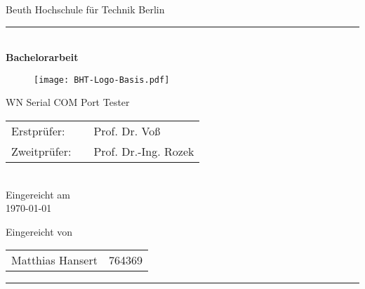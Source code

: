 

\begin{titlepage}
	\begin{center}
		\Large
		Beuth Hochschule für Technik Berlin
		\textcolor{darkBHT}{\rule{\textwidth}{0.2cm}} \\
		\vspace{2 cm}
		\Huge
		\textbf{Bachelorarbeit}
		\vspace{2 cm}
		
		\begin{figure}[htbp]
			\centering 
			\texttt{[image: BHT-Logo-Basis.pdf]}  
		\end{figure}
		
		\vspace{3cm}
		\Large
		WN Serial COM Port Tester\\
		\vspace{3cm}
		\begin{tabular}{lcl}
			Erstprüfer:& &Prof. Dr. Voß\\
			Zweitprüfer:& &Prof. Dr.-Ing. Rozek\\
		\end{tabular} 
		\\
		\vspace{0.8cm}
		Eingereicht am \\
		\today %
		\vspace{0.8cm}
		
		Eingereicht von \\
		\begin{tabular}{ll}
			Matthias Hansert & 764369\\
		\end{tabular}

	\end{center}
	\vfill
	\textcolor{darkBHT}{\rule{\textwidth}{0.2cm}}
	\vspace{1 cm}
	\normalsize
	
\end{titlepage}

%
%